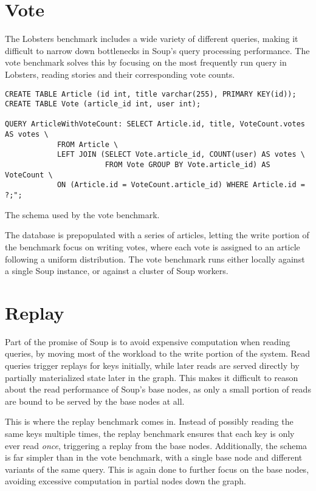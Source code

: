 \section{Vote}

The Lobsters benchmark includes a wide variety of different queries, making it
difficult to narrow down bottlenecks in Soup's query processing performance. The
vote benchmark solves this by focusing on the most frequently run query in
Lobsters, reading stories and their corresponding vote counts.

\begin{listing}[H]
  \begin{verbatim}
CREATE TABLE Article (id int, title varchar(255), PRIMARY KEY(id));
CREATE TABLE Vote (article_id int, user int);

QUERY ArticleWithVoteCount: SELECT Article.id, title, VoteCount.votes AS votes \
            FROM Article \
            LEFT JOIN (SELECT Vote.article_id, COUNT(user) AS votes \
                       FROM Vote GROUP BY Vote.article_id) AS VoteCount \
            ON (Article.id = VoteCount.article_id) WHERE Article.id = ?;";
  \end{verbatim}

  \caption{The schema used by the vote benchmark.}\label{lst:vote}
\end{listing}

The database is prepopulated with a series of articles, letting the write
portion of the benchmark focus on writing votes, where each vote is assigned to
an article following a uniform distribution. The vote benchmark runs either
locally against a single Soup instance, or against a cluster of Soup workers.

\todo{mention open loop and sojourn time}

\section{Replay}

Part of the promise of Soup is to avoid expensive computation when reading
queries, by moving most of the workload to the write portion of the system. Read
queries trigger replays for keys initially, while later reads are served
directly by partially materialized state later in the graph. This makes it
difficult to reason about the read performance of Soup's base nodes, as only a
small portion of reads are bound to be served by the base nodes at all.

This is where the replay benchmark comes in. Instead of possibly reading the
same keys multiple times, the replay benchmark ensures that each key is only
ever read \textit{once}, triggering a replay from the base nodes. Additionally,
the schema is far simpler than in the vote benchmark, with a single base node
and different variants of the same query. This is again done to further focus on
the base nodes, avoiding excessive computation in partial nodes down the graph.

